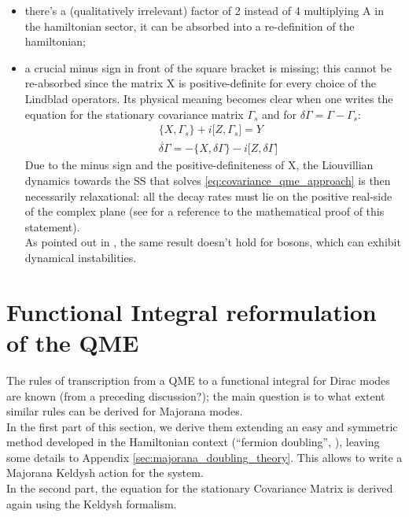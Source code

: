 \documentclass[a4paper,11pt]{article}
\theoremstyle{remark}
\newcommand{\np}{\vskip 1.3cm}
\begin{document}
   \begin{itemize} 
   \item there's a (qualitatively irrelevant) factor of 2 instead of 4 multiplying A in the hamiltonian sector, it can be absorbed into a re-definition of the hamiltonian; 
   \item a crucial minus sign in front of the square bracket is missing; this cannot be re-absorbed since the matrix X is positive-definite for every choice of the Lindblad operators. Its physical meaning becomes clear when one writes the equation for the stationary covariance matrix $\Gamma_s$ and for $\delta\Gamma=\Gamma-\Gamma_s$:
   \begin{subequations}
    \begin{align}
     &\big\{ X,\Gamma_s\big\}+i\big[Z,\Gamma_s\big] = Y  \label{eq:covariance_qme_stationary} \\
     &\dot{\delta\Gamma}=-\big\{ X,\delta\Gamma\big\}-i\big[Z,\delta\Gamma\big] \label{eq:covariance_qme_approach}
    \end{align}
   \end{subequations}
   Due to the minus sign and the positive-definiteness of X, the Liouvillian dynamics towards the SS that solves \ref{eq:covariance_qme_approach} is then necessarily relaxational: all the decay rates  must lie on the positive real-side of the complex plane (see \cite{Eisert2010} for a reference to the mathematical proof of this statement).\\ As pointed out in \cite{Eisert2010}, the same result doesn't hold for bosons, which can exhibit dynamical instabilities.\end{itemize}\np


   
 \section{Functional Integral reformulation of the QME}
 The rules of transcription from a QME to a functional integral for Dirac modes are known (from a preceding discussion?); the main question is to what extent similar rules can be derived for Majorana modes.\\ In the first part of this section, we derive them extending an easy and symmetric method developed in the Hamiltonian context (``fermion doubling'', \cite{Nilsson2013}), leaving some details to Appendix \ref{sec:majorana_doubling_theory}. This allows to write a Majorana Keldysh action for the system. \\In the second part, the equation for the stationary Covariance Matrix is derived again using the Keldysh formalism.\np
\end{document}
